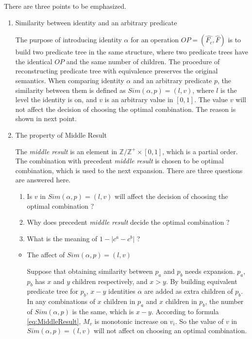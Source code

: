 There are three points to be emphasized.
\begin{enumerate}
\item Similarity between identity and an arbitrary predicate

	The purpose of introducing identity $\alpha$ for an operation $OP=(\hat{F_c},\hat{F})$ is to build two predicate tree in the same structure, where two predicate trees have the identical $OP$ and the same number of children. The procedure of reconstructing predicate tree with equivalence preserves the original semantics. When comparing identity $\alpha$ and an arbitrary predicate $p$, the similarity between them is defined as $Sim(\alpha, p) = (l, v)$, where $l$ is the level the identity is on, and $v$ is an arbitrary value in $[0,1]$. The value $v$ will not affect the decision of choosing the optimal combination. The reason is shown in next point. 
	 
\item The property of Middle Result

	The \textit{middle result} is an element in $\mathbb{Z}/\mathbb{Z^+} \times [0,1]$, which is a partial order. The combination with precedent \textit{middle result} is chosen to be optimal combination, which is used to the next expansion. There are three questions are answered here. 
\begin{enumerate}	
\item Is $v$ in $Sim(\alpha,p)=(l,v)$ will affect the decision of choosing the optimal combination ? 
\item Why does precedent \textit{middle result} decide the optimal combination ?
\item What is the meaning of  $1- \lvert c^a - c^b  \rvert$ ?
\end{enumerate}
 	\begin{itemize}
	
	\item The affect of $Sim(\alpha, p)=(l,v)$
		
		 Suppose that obtaining similarity between $p_a$ and $p_b$ needs expansion. $p_a$, $p_b$ has $x$ and $y$ children respectively, and $x>y$. By building equivalent predicate tree for $p_b$, $x-y$ identities $\alpha$ are added as extra children of $p_b$. In any combinations of $x$ children in $p_a$ and $x$ children in $p_b$,  the number of $Sim(\alpha, p)$ is the same, which is $x-y$. According to formula \ref{eq:MiddleResult}, $M_v$ is monotonic increase on $v_i$. So the value of $v$ in $Sim(\alpha, p)=(l,v)$ will not affect on choosing an optimal combination.
		 

\end{itemize}
\end{enumerate}
